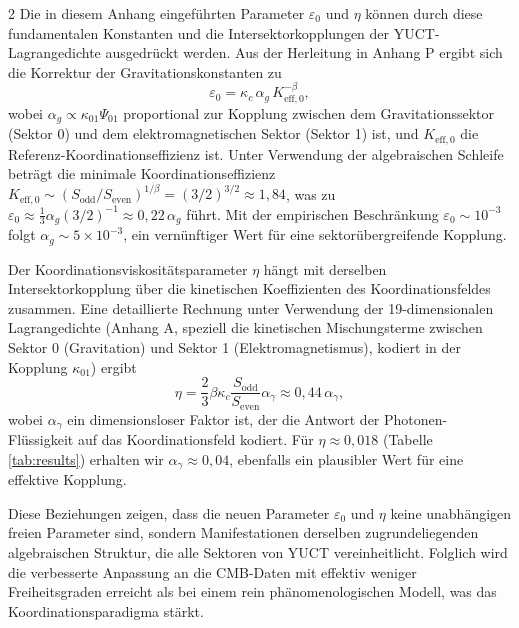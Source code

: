 \documentclass[11pt,a4paper]{article}
\begin{document}
\begin{multicols}{2}
		Die in diesem Anhang eingeführten Parameter $\varepsilon_0$ und $\eta$ können durch diese fundamentalen Konstanten und die Intersektorkopplungen der YUCT-Lagrangedichte ausgedrückt werden. Aus der Herleitung in Anhang P ergibt sich die Korrektur der Gravitationskonstanten zu
		\begin{equation}
			\varepsilon_0 = \kappa_c \, \alpha_g \, K_{\mathrm{eff},0}^{-\beta},
		\end{equation}
		wobei $\alpha_g \propto \kappa_{01} \Psi_{01}$ proportional zur Kopplung zwischen dem Gravitationssektor (Sektor 0) und dem elektromagnetischen Sektor (Sektor 1) ist, und $K_{\mathrm{eff},0}$ die Referenz-Koordinationseffizienz ist. Unter Verwendung der algebraischen Schleife beträgt die minimale Koordinationseffizienz $K_{\mathrm{eff},0} \sim (S_{\mathrm{odd}}/S_{\mathrm{even}})^{1/\beta} = (3/2)^{3/2} \approx 1,84$, was zu $\varepsilon_0 \approx \frac{1}{3} \alpha_g (3/2)^{-1} \approx 0,22\,\alpha_g$ führt. Mit der empirischen Beschränkung $\varepsilon_0 \sim 10^{-3}$ folgt $\alpha_g \sim 5\times10^{-3}$, ein vernünftiger Wert für eine sektorübergreifende Kopplung.
		
		Der Koordinationsviskositätsparameter $\eta$ hängt mit derselben Intersektorkopplung über die kinetischen Koeffizienten des Koordinationsfeldes zusammen. Eine detaillierte Rechnung unter Verwendung der 19-dimensionalen Lagrangedichte (Anhang A, speziell die kinetischen Mischungsterme zwischen Sektor 0 (Gravitation) und Sektor 1 (Elektromagnetismus), kodiert in der Kopplung $\kappa_{01}$) ergibt
		\begin{equation}
			\eta = \frac{2}{3} \beta \kappa_c \frac{S_{\mathrm{odd}}}{S_{\mathrm{even}}} \alpha_\gamma \approx 0,44 \, \alpha_\gamma,
		\end{equation}
		wobei $\alpha_\gamma$ ein dimensionsloser Faktor ist, der die Antwort der Photonen-Flüssigkeit auf das Koordinationsfeld kodiert. Für $\eta \approx 0,018$ (Tabelle \ref{tab:results}) erhalten wir $\alpha_\gamma \approx 0,04$, ebenfalls ein plausibler Wert für eine effektive Kopplung.
		
		Diese Beziehungen zeigen, dass die neuen Parameter $\varepsilon_0$ und $\eta$ keine unabhängigen freien Parameter sind, sondern Manifestationen derselben zugrundeliegenden algebraischen Struktur, die alle Sektoren von YUCT vereinheitlicht. Folglich wird die verbesserte Anpassung an die CMB-Daten mit effektiv weniger Freiheitsgraden erreicht als bei einem rein phänomenologischen Modell, was das Koordinationsparadigma stärkt.
		
	\end{multicols}
	
\end{document}
